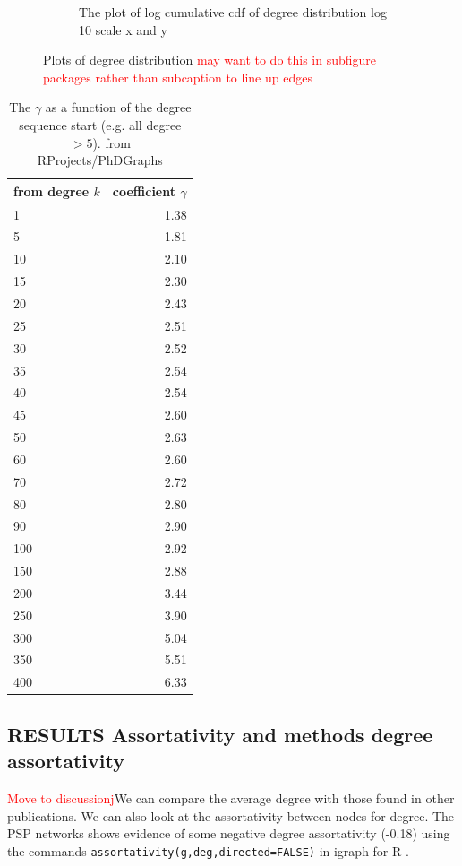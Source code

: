 \begin{figure}
\begin{subfigure}[t]{0.45\textwidth}
        \caption{The plot of log cumulative cdf of degree distribution log 10 scale x and y} \label{fig:log_degree_distribution}
    \end{subfigure}
    \caption{Plots of degree distribution \textcolor{red}{may want to do this in subfigure packages rather than subcaption to line up edges}}
\end{figure}

\begin{table}[ht]
\centering
\begin{tabular}{lr}
  \hline
  from degree $k$ & coefficient $\gamma$ \\ 
  \hline
1 & 1.38 \\ 
  5 & 1.81 \\ 
  10 & 2.10 \\ 
  15 & 2.30 \\ 
  20 & 2.43 \\ 
  25 & 2.51 \\ 
   30 & 2.52 \\ 
  35 & 2.54 \\ 
   40 & 2.54 \\ 
   45 & 2.60 \\ 
  50 & 2.63 \\ 
   60 & 2.60 \\ 
   70 & 2.72 \\ 
   80 & 2.80 \\ 
   90 & 2.90 \\ 
   100 & 2.92 \\ 
  150 & 2.88 \\ 
   200 & 3.44 \\ 
   250 & 3.90 \\ 
  300 & 5.04 \\ 
   350 & 5.51 \\ 
   400 & 6.33 \\ 
   \hline
\end{tabular}
\caption{The $\gamma$ as a function of the degree sequence start (e.g. all degree $>5$). from RProjects/PhDGraphs}
  \label{table:gamma}
\end{table}

\subsection{RESULTS Assortativity and methods degree assortativity}
\textcolor{red}{Move to discussionj}We can compare the average degree with those found in other publications. We can also look at the assortativity between nodes for degree. The PSP networks shows evidence of some negative degree assortativity (-0.18) using the commands \texttt{assortativity(g,deg,directed=FALSE)} in igraph for R .


